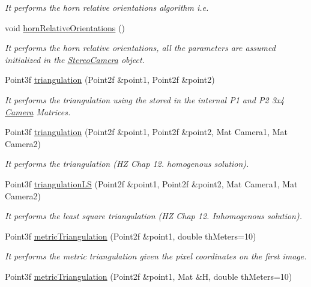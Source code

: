 \begin{DoxyCompactItemize}
\begin{DoxyCompactList}\small\item\em It performs the horn relative orientations algorithm i.\+e. \end{DoxyCompactList}\item 
void \hyperlink{classStereoCamera_a36dae897d07544e8faca8c90216173a6}{horn\+Relative\+Orientations} ()
\begin{DoxyCompactList}\small\item\em It performs the horn relative orientations, all the parameters are assumed initialized in the \hyperlink{classStereoCamera}{Stereo\+Camera} object. \end{DoxyCompactList}\item 
Point3f \hyperlink{classStereoCamera_a3c8ef84424fa111c63437a3db8f04333}{triangulation} (Point2f \&point1, Point2f \&point2)
\begin{DoxyCompactList}\small\item\em It performs the triangulation using the stored in the internal P1 and P2 3x4 \hyperlink{classCamera}{Camera} Matrices. \end{DoxyCompactList}\item 
Point3f \hyperlink{classStereoCamera_ab68c8d3bd07f542243d681fbe8c8c6b7}{triangulation} (Point2f \&point1, Point2f \&point2, Mat Camera1, Mat Camera2)
\begin{DoxyCompactList}\small\item\em It performs the triangulation (HZ Chap 12. homogenous solution). \end{DoxyCompactList}\item 
Point3f \hyperlink{classStereoCamera_aaef25d8723eefdbab6e27c348492126b}{triangulation\+LS} (Point2f \&point1, Point2f \&point2, Mat Camera1, Mat Camera2)
\begin{DoxyCompactList}\small\item\em It performs the least square triangulation (HZ Chap 12. Inhomogenous solution). \end{DoxyCompactList}\item 
Point3f \hyperlink{classStereoCamera_a2fcd3e1767bcf04716b0e2ac76098430}{metric\+Triangulation} (Point2f \&point1, double th\+Meters=10)
\begin{DoxyCompactList}\small\item\em It performs the metric triangulation given the pixel coordinates on the first image. \end{DoxyCompactList}\item 
Point3f \hyperlink{classStereoCamera_a3cf53fac6336eea107a26bd5cdbbdd03}{metric\+Triangulation} (Point2f \&point1, Mat \&H, double th\+Meters=10)

\end{DoxyCompactItemize}
